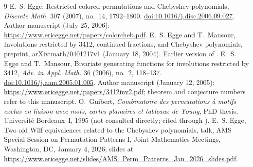 \documentclass[11pt]{amsart}
\theoremstyle{definition}
\begin{document}
\begin{thebibliography}{9}
 E.~S. Egge, Restricted colored permutations and Chebyshev polynomials, \emph{Discrete Math.} 307 (2007), no.~14, 1792--1800. \href{https://doi.org/10.1016/j.disc.2006.09.027}{doi:10.1016/j.disc.2006.09.027}. Author manuscript (July 25, 2006): \url{https://www.ericegge.net/papers/colorcheb.pdf}.
 E.~S. Egge and T.~Mansour, Involutions restricted by 3412, continued fractions, and Chebyshev polynomials, preprint, arXiv:math/0401217v1 (January 18, 2004). Earlier version of \cite{EggeMansour2006}.
 E.~S. Egge and T.~Mansour, Bivariate generating functions for involutions restricted by 3412, \emph{Adv. in Appl. Math.} 36 (2006), no.~2, 118--137. \href{https://doi.org/10.1016/j.aam.2005.01.005}{doi:10.1016/j.aam.2005.01.005}. Author manuscript (January 12, 2005): \url{https://www.ericegge.net/papers/3412inv2.pdf}; theorem and conjecture numbers refer to this manuscript.
 O.~Guibert, \emph{Combinatoire des permutations \`a motifs exclus en liaison avec mots, cartes planaires et tableaux de Young}, PhD thesis, Universit\'e Bordeaux~I, 1995 (not consulted directly; cited through \cite{EggeMansour2006}).
 E.~S. Egge, Two old Wilf equivalences related to the Chebyshev polynomials, talk, AMS Special Session on Permutation Patterns I, Joint Mathematics Meetings, Washington, DC, January 4, 2026; slides at \url{https://www.ericegge.net/slides/AMS_Perm_Patterns_Jan_2026_slides.pdf}.
\end{thebibliography}
\end{document}
